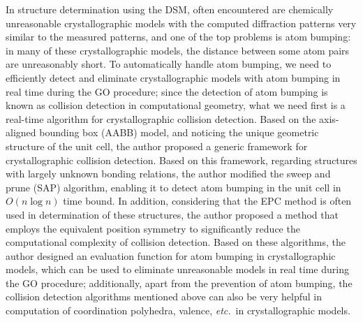 \begin{eabstract}
	In structure determination using the DSM, often encountered are chemically
	unreasonable crystallographic models with the computed diffraction patterns
	very similar to the measured patterns, and one of the top problems is
	atom bumping: in many of these crystallographic models, the distance
	between some atom pairs are unreasonably short.  To automatically handle
	atom bumping, we need to efficiently detect and eliminate crystallographic
	models with atom bumping in real time during the GO procedure;
	since the detection of atom bumping is known as collision detection in
	computational geometry, what we need first is a real-time algorithm
	for crystallographic collision detection.  Based on the axis-aligned
	bounding box (AABB) model, and noticing the unique geometric structure
	of the unit cell, the author proposed a generic framework for
	crystallographic collision detection.  Based on this framework,
	regarding structures with largely unknown bonding relations,
	the author modified the sweep and prune (SAP) algorithm, enabling it to
	detect atom bumping in the unit cell in $O(n\log n)$ time bound.
	In addition, considering that the EPC method is often used in
	determination of these structures, the author proposed a method that
	employs the equivalent position symmetry to significantly reduce the
	computational complexity of collision detection.  Based on these algorithms,
	the author designed an evaluation function for atom bumping in
	crystallographic models, which can be used to eliminate unreasonable models
	in real time during the GO procedure; additionally, apart from the
	prevention of atom bumping, the collision detection algorithms mentioned
	above can also be very helpful in computation of coordination polyhedra,
	valence, \emph{etc.}\ in crystallographic models.


\end{eabstract}
